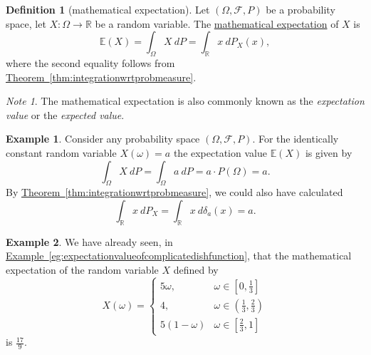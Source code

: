 \documentclass[a4paper]{scrartcl}
\newcommand{\R}{\mathbb{R}}
\newcommand{\defn}[1]{\ul{#1}}
\theoremstyle{definition}
\newtheorem{definition}{Definition}[section]
\newtheorem{example}{Example}[section]
\theoremstyle{plain}
\theoremstyle{remark}
\newtheorem{note}{Note}[section]
\begin{document}
\begin{definition}[mathematical expectation]
  \label{def:mathematicalexpectation}
  Let $(\Omega,\mathcal{F}, P)$ be a probability space, let $X\colon \Omega \to \R$ be a random variable. The \defn{mathematical expectation} of $X$ is
  \begin{equation*}
    \mathbb{E}(X) = \int_{\Omega} X\ dP = \int_{\R} x\ dP_{X}(x),
  \end{equation*}
  where the second equality follows from \hyperref[thm:integrationwrtprobmeasure]{Theorem~\ref*{thm:integrationwrtprobmeasure}}.
\end{definition}

\begin{note}
  The mathematical expectation is also commonly known as the \emph{expectation value} or the \emph{expected value}.
\end{note}

\begin{example}
  Consider any probability space $(\Omega, \mathcal{F}, P)$. For the identically constant random variable $X(\omega) = a$ the expectation value $\mathbb{E}(X)$ is given by
  \begin{equation*}
    \int_{\Omega} X\ dP = \int_{\Omega} a\ dP = a\cdot P(\Omega) = a.
  \end{equation*}
  By \hyperref[thm:integrationwrtprobmeasure]{Theorem~\ref*{thm:integrationwrtprobmeasure}}, we could also have calculated
  \begin{equation*}
    \int_{\R} x\ dP_{X} = \int_{\R} x\ d\delta_{a}(x) = a.
  \end{equation*}
\end{example}

\begin{example}
  We have already seen, in \hyperref[eg:expectationvalueofcomplicatedishfunction]{Example~\ref*{eg:expectationvalueofcomplicatedishfunction}}, that the mathematical expectation of the random variable $X$ defined by
  \begin{equation*}
    X(\omega) =
    \begin{cases}
      5\omega, & \omega \in \left[ 0, \frac{1}{3} \right] \\
      4, & \omega \in \left( \frac{1}{3}, \frac{2}{3} \right) \\
      5(1-\omega) & \omega \in \left[ \frac{2}{3}, 1 \right]
    \end{cases}
  \end{equation*}
  is $\frac{17}{9}$.
\end{example}
\end{document}
